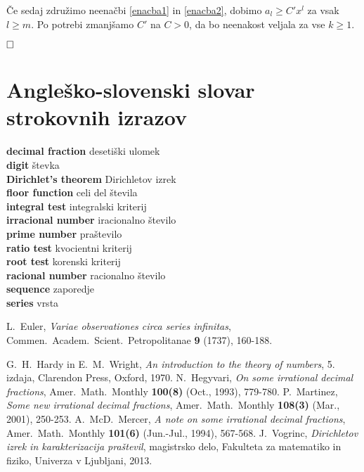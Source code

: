 \documentclass[a4paper,12pt]{article}
\newcommand{\geslo}[2]{\noindent\textbf{#1} \quad \hangindent=1cm #2\\[-1pc]}
\def\qed{$\hfill\Box$}   %
\begin{document}
Če sedaj združimo neenačbi \ref{enacba1} in \ref{enacba2}, dobimo 
$a_l \geq C'x^l$ za vsak $l \geq m$.
Po potrebi zmanjšamo $C'$ na $C>0$, da bo neenakost veljala
za vse $k \geq 1$.

\qed

\section*{Angleško-slovenski slovar strokovnih izrazov}

\geslo{decimal fraction}{desetiški ulomek}

\geslo{digit}{števka}

\geslo{Dirichlet's theorem}{Dirichletov izrek}

\geslo{floor function}{celi del števila}

\geslo{integral test}{integralski kriterij}

\geslo{irracional number}{iracionalno število}

\geslo{prime number}{praštevilo}

\geslo{ratio test}{kvocientni kriterij}

\geslo{root test}{korenski kriterij}

\geslo{racional number}{racionalno število}

\geslo{sequence}{zaporedje}

\geslo{series}{vrsta}

\begin{thebibliography}{1}
    L.~Euler, \emph{Variae observationes circa series infinitas},
    Commen.~Academ.~Scient.~Petropolitanae \textbf{9} (1737), 160-188.

    G.~H.~Hardy in E.~M.~Wright, \emph{An introduction to the theory of numbers}, 
    5. izdaja, Clarendon Press, Oxford, 1970.
    N.~Hegyvari, \emph{On some irrational decimal fractions},
    Amer.~Math.~Monthly \textbf{100(8)}  (Oct., 1993),  779-780.
    P.~Martinez, \emph{Some new irrational decimal fractions},
    Amer.~Math.~Monthly \textbf{108(3)}  (Mar., 2001),  250-253.
    A.~McD.~Mercer, \emph{A note on some irrational decimal fractions},
    Amer.~Math.~Monthly \textbf{101(6)}  (Jun.-Jul., 1994),  567-568.
    J.~Vogrinc, \emph{Dirichletov izrek in karakterizacija praštevil}, 
    magistrsko delo, Fakulteta za matematiko in fiziko, Univerza v Ljubljani, 2013.
    
\end{thebibliography}
\end{document}

